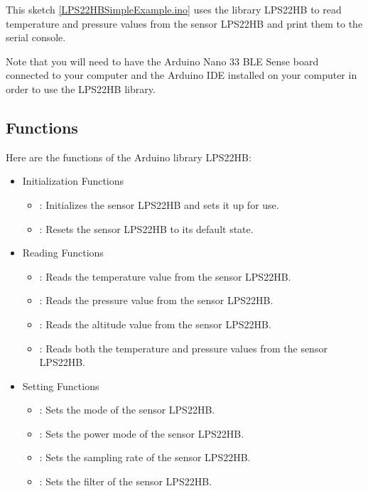 \medskip

This sketch \ref{LPS22HBSimpleExample.ino} uses the library LPS22HB to read temperature and pressure values from the sensor LPS22HB and print them to the serial console.

Note that you will need to have the Arduino Nano 33 BLE Sense board connected to your computer and the Arduino IDE installed on your computer in order to use the LPS22HB library.


\subsection{Functions}
Here are the functions of the Arduino library LPS22HB:

\begin{itemize}
  \item Initialization Functions
    \begin{itemize}
      \item {}: Initializes the sensor LPS22HB and sets it up for use.
      \item {}: Resets the sensor LPS22HB to its default state.
    \end{itemize}
  \item Reading Functions
    \begin{itemize}
      \item {}: Reads the temperature value from the sensor LPS22HB.
      \item {}: Reads the pressure value from the sensor LPS22HB.
      \item {}: Reads the altitude value from the sensor LPS22HB.
      \item {}: Reads both the temperature and pressure values from the sensor LPS22HB.
    \end{itemize}
  \item Setting Functions
    \begin{itemize}
      \item {}: Sets the mode of the sensor LPS22HB.
      \item {}: Sets the power mode of the sensor LPS22HB.
      \item {}: Sets the sampling rate of the sensor LPS22HB.
      \item {}: Sets the filter of the sensor LPS22HB.
    \end{itemize}

\end{itemize}
